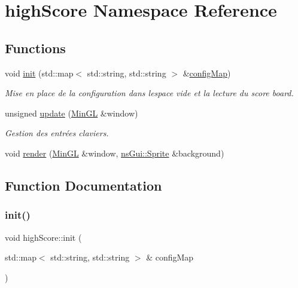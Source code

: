 \hypertarget{namespacehigh_score}{}\section{high\+Score Namespace Reference}
\label{namespacehigh_score}
\subsection*{Functions}
\begin{DoxyCompactItemize}
\item 
void \hyperlink{namespacehigh_score_a9d535492f023442be456ef57e7f54795}{init} (std\+::map$<$ std\+::string, std\+::string $>$ \&\hyperlink{main_8cpp_ada2160bcc2082e595d02f0eb5a318dd5}{config\+Map})
\begin{DoxyCompactList}\small\item\em Mise en place de la configuration dans l\textquotesingle{}espace vide et la lecture du score board. \end{DoxyCompactList}\item 
unsigned \hyperlink{namespacehigh_score_a60c5c3618740163b7a61fe9fbabaedc0}{update} (\hyperlink{class_min_g_l}{Min\+GL} \&window)
\begin{DoxyCompactList}\small\item\em Gestion des entrées claviers. \end{DoxyCompactList}\item 
void \hyperlink{namespacehigh_score_ae5948b376db24ab12e060a5d679ff9c8}{render} (\hyperlink{class_min_g_l}{Min\+GL} \&window, \hyperlink{classns_gui_1_1_sprite}{ns\+Gui\+::\+Sprite} \&background)
\end{DoxyCompactItemize}


\subsection{Function Documentation}
\mbox{\label{namespacehigh_score_a9d535492f023442be456ef57e7f54795}} 
\subsubsection{\texorpdfstring{init()}{init()}}
{\footnotesize\ttfamily void high\+Score\+::init (\begin{DoxyParamCaption}\item[{std\+::map$<$ std\+::string, std\+::string $>$ \&}]{config\+Map }\end{DoxyParamCaption})}



